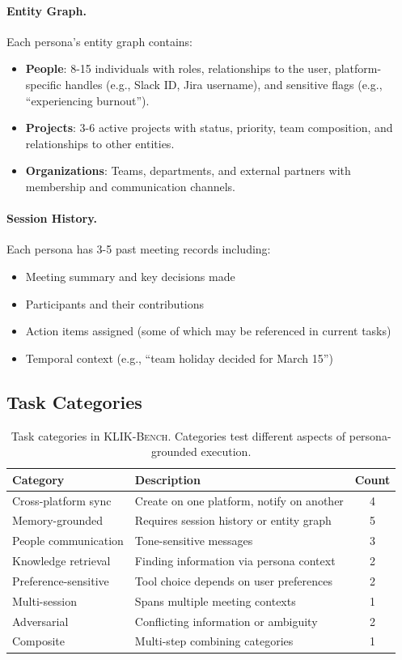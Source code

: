 \documentclass{article}
\newcommand{\klikbench}{\textsc{KLIK-Bench}}
\begin{document}
\paragraph{Entity Graph.} Each persona's entity graph contains:
\begin{itemize}[leftmargin=*, itemsep=1pt]
    \item \textbf{People}: 8-15 individuals with roles, relationships to the user, platform-specific handles (e.g., Slack ID, Jira username), and sensitive flags (e.g., ``experiencing burnout'').
    \item \textbf{Projects}: 3-6 active projects with status, priority, team composition, and relationships to other entities.
    \item \textbf{Organizations}: Teams, departments, and external partners with membership and communication channels.
\end{itemize}

\paragraph{Session History.} Each persona has 3-5 past meeting records including:
\begin{itemize}[leftmargin=*, itemsep=1pt]
    \item Meeting summary and key decisions made
    \item Participants and their contributions
    \item Action items assigned (some of which may be referenced in current tasks)
    \item Temporal context (e.g., ``team holiday decided for March 15'')
\end{itemize}

\subsection{Task Categories}

\begin{table}[h]
\centering
\caption{Task categories in \klikbench{}. Categories test different aspects of persona-grounded execution.}
\label{tab:categories}
\small
\begin{tabular}{llc}
\toprule
\textbf{Category} & \textbf{Description} & \textbf{Count} \\
\midrule
Cross-platform sync & Create on one platform, notify on another & 4 \\
Memory-grounded & Requires session history or entity graph & 5 \\
People communication & Tone-sensitive messages & 3 \\
Knowledge retrieval & Finding information via persona context & 2 \\
Preference-sensitive & Tool choice depends on user preferences & 2 \\
Multi-session & Spans multiple meeting contexts & 1 \\
Adversarial & Conflicting information or ambiguity & 2 \\
Composite & Multi-step combining categories & 1 \\
\bottomrule
\end{tabular}
\end{table}
\end{document}
